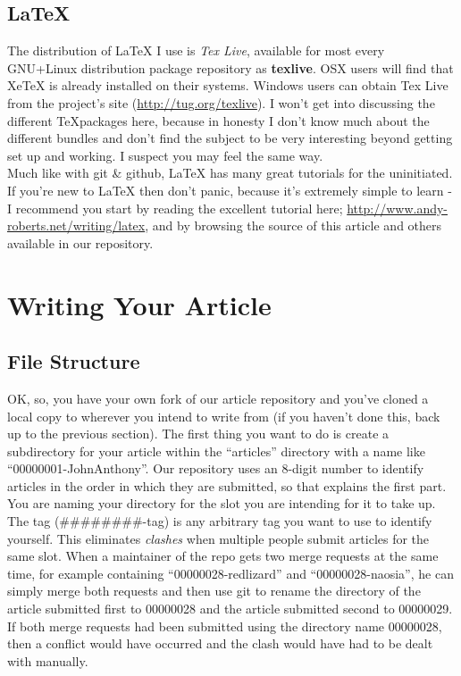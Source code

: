 \documentclass{amsart}
\begin{document}
\subsection{LaTeX{}}
  The distribution of \LaTeX{} I use is \emph{Tex Live}, available for most every GNU+Linux distribution package repository as \textbf{texlive}. OSX users will find that XeTeX is already installed on their systems. Windows users can obtain Tex Live from the project's site (\url{http://tug.org/texlive}). I won't get into discussing the different \TeX packages here, because in honesty I don't know much about the different bundles and don't find the subject to be very interesting beyond getting set up and working. I suspect you may feel the same way. \\
  Much like with git \& github, \LaTeX{} has many great tutorials for the uninitiated. If you're new to \LaTeX{} then don't panic, because it's extremely simple to learn - I recommend you start by reading the excellent tutorial here; \url{http://www.andy-roberts.net/writing/latex}, and by browsing the source of this article and others available in our repository.

\section{Writing Your Article}
\subsection{File Structure}
  OK, so, you have your own fork of our article repository and you've cloned a local copy to wherever you intend to write from (if you haven't done this, back up to the previous section). The first thing you want to do is create a subdirectory for your article within the ``articles'' directory with a name like ``00000001-JohnAnthony''. Our repository uses an 8-digit number to identify articles in the order in which they are submitted, so that explains the first part. You are naming your directory for the slot you are intending for it to take up. \\
  The tag (\#\#\#\#\#\#\#\#-tag) is any arbitrary tag you want to use to identify yourself. This eliminates \emph{clashes} when multiple people submit articles for the same slot. When a maintainer of the repo gets two merge requests at the same time, for example containing ``00000028-redlizard'' and ``00000028-naosia'', he can simply merge both requests and then use git to rename the directory of the article submitted first to 00000028 and the article submitted second to 00000029. If both merge requests had been submitted using the directory name 00000028, then a conflict would have occurred and the clash would have had to be dealt with manually. \\
\end{document}
